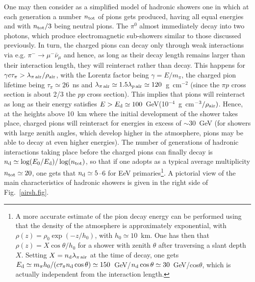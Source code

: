\documentclass[twoside,12pt]{article}
\begin{document}
One may then consider as a simplified model of hadronic showers \cite{ma05} one in which at each generation a number $n_{\rm tot}$ of pions gets produced, having all equal energies and with $n_{\rm tot}/3$ being neutral pions. The  $\pi^0$ almost immediately decay into two photons, which produce electromagnetic sub-showers similar to those discussed previously. In turn, the charged pions can decay only through weak interactions via e.g. $\pi^-\to\mu^-\bar{\nu}_\mu$ and hence, as long as their decay length remains larger than their interaction length, they will reinteract rather than decay.  This happens for $\gamma c\tau_{\pi}>\lambda_{\pi\,{\rm air}}/\rho_{\rm air}$, with the Lorentz factor being $\gamma=E/m_\pi$, the charged pion lifetime being $\tau_\pi\simeq 26$~ns and $\lambda_{\pi\,{\rm air}}\simeq 1.5\lambda_{p\,{\rm air}}\simeq 120$~g~cm$^{-2}$ (since the $\pi p$ cross section is about 2/3 the $pp$ cross section). This implies that pions will reinteract as long as their energy satisfies $E>E_{\rm d}\simeq 100$~GeV(10$^{-4}$~g~cm$^{-3}/\rho_{\rm air})$. Hence, at the  heights above 10~km where the initial development of the shower takes place, charged pions will reinteract for energies in excess of $\sim 30$~GeV (for showers with large zenith angles, which develop higher in the atmosphere, pions may be able to decay at even higher energies).  The number of generations of hadronic interactions taking place before the charged pions can finally decay is $n_{\rm d}\simeq \log(E_0/E_{\rm d})/\log(n_{\rm tot})$, so that if one adopts as a typical average multiplicity $n_{\rm tot}\simeq 20$, one gets that  $n_{\rm d}\simeq  5$--6 for EeV primaries\footnote{A more accurate estimate of the pion decay energy can be performed \cite{ka12} using that the density of the atmosphere is approximately exponential, with $\rho(z)=\rho_0 \exp(-z/h_0)$, with $h_0\simeq 10$~km. One has then that $\rho(z)=X\cos\theta/h_0$ for a shower with zenith $\theta$ after traversing a slant depth $X$. Setting $X=n_{\rm d}\lambda_{\pi\,{\rm air}}$ at the time of decay, one gets $E_{\rm d}\simeq m_\pi h_0/(c\tau_\pi n_{\rm d}\cos\theta)\simeq 150$~GeV/$n_{\rm d}\cos\theta\simeq 30$~GeV/cos$\theta$, which is actually independent from the interaction length.}. A pictorial view of the main characteristics of  hadronic showers is given in the right side of Fig.~\ref{airsh.fig}.
\end{document}
